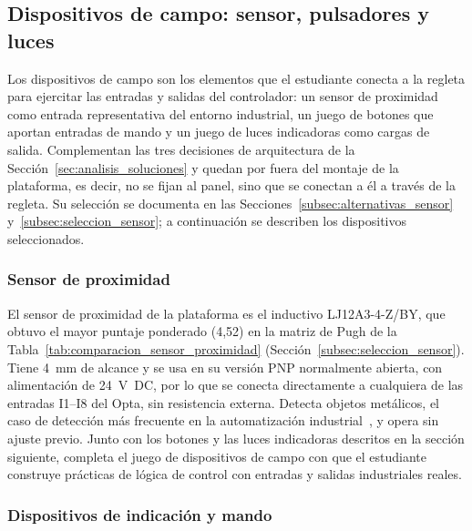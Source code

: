 \documentclass[12pt,a4paper,oneside]{report}
\begin{document}
\subsection{Dispositivos de campo: sensor, pulsadores y luces}
\label{subsec:hw_campo}

Los dispositivos de campo son los elementos que el estudiante conecta a la regleta para ejercitar las entradas y salidas del controlador: un sensor de proximidad como entrada representativa del entorno industrial, un juego de botones que aportan entradas de mando y un juego de luces indicadoras como cargas de salida. Complementan las tres decisiones de arquitectura de la Sección~\ref{sec:analisis_soluciones} y quedan por fuera del montaje de la plataforma, es decir, no se fijan al panel, sino que se conectan a él a través de la regleta. Su selección se documenta en las Secciones~\ref{subsec:alternativas_sensor} y~\ref{subsec:seleccion_sensor}; a continuación se describen los dispositivos seleccionados.

\subsubsection{Sensor de proximidad}
\label{subsubsec:hw_sensor}

El sensor de proximidad de la plataforma es el inductivo LJ12A3-4-Z/BY, que obtuvo el mayor puntaje ponderado (4{,}52) en la matriz de Pugh de la Tabla~\ref{tab:comparacion_sensor_proximidad} (Sección~\ref{subsec:seleccion_sensor}). Tiene 4~mm de alcance y se usa en su versión PNP normalmente abierta, con alimentación de 24~V~DC, por lo que se conecta directamente a cualquiera de las entradas I1--I8 del Opta, sin resistencia externa. Detecta objetos metálicos, el caso de detección más frecuente en la automatización industrial~\cite{ref23}, y opera sin ajuste previo. Junto con los botones y las luces indicadoras descritos en la sección siguiente, completa el juego de dispositivos de campo con que el estudiante construye prácticas de lógica de control con entradas y salidas industriales reales.

\subsubsection{Dispositivos de indicación y mando}
\label{subsubsec:hw_indicacion_mando}
\end{document}
